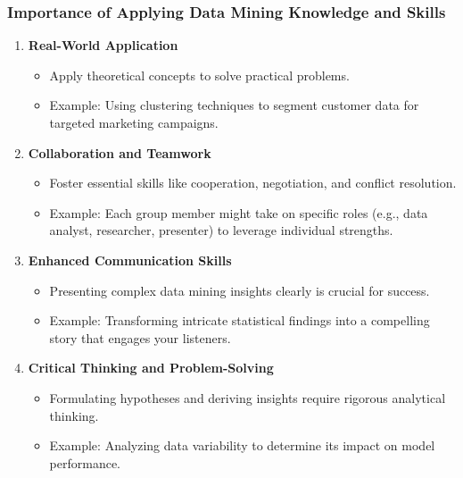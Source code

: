 \documentclass{beamer}
\begin{document}
\begin{frame}[fragile]
    \frametitle{Importance of Applying Data Mining Knowledge and Skills}
    \begin{enumerate}
        \item \textbf{Real-World Application} 
        \begin{itemize}
            \item Apply theoretical concepts to solve practical problems.
            \item Example: Using clustering techniques to segment customer data for targeted marketing campaigns.
        \end{itemize}
        
        \item \textbf{Collaboration and Teamwork}
        \begin{itemize}
            \item Foster essential skills like cooperation, negotiation, and conflict resolution.
            \item Example: Each group member might take on specific roles (e.g., data analyst, researcher, presenter) to leverage individual strengths.
        \end{itemize}
        
        \item \textbf{Enhanced Communication Skills}
        \begin{itemize}
            \item Presenting complex data mining insights clearly is crucial for success.
            \item Example: Transforming intricate statistical findings into a compelling story that engages your listeners.
        \end{itemize}
        
        \item \textbf{Critical Thinking and Problem-Solving}
        \begin{itemize}
            \item Formulating hypotheses and deriving insights require rigorous analytical thinking.
            \item Example: Analyzing data variability to determine its impact on model performance.
        \end{itemize}
    \end{enumerate}
\end{frame}
\end{document}

